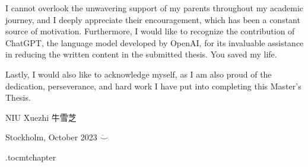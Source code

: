 I cannot overlook the unwavering support of my parents throughout my academic journey, and I deeply appreciate their encouragement, which has been a constant source of motivation. Furthermore, I would like to recognize the contribution of ChatGPT, the language model developed by OpenAI, for its invaluable assistance in reducing the written content in the submitted thesis. You saved my life.

Lastly, I would also like to acknowledge myself, as I am also proud of the dedication, perseverance, and hard work I have put into completing this Master's Thesis.

\vspace{2cm}
\hfill NIU Xuezhi 牛雪芝

\hfill Stockholm, October 2023 $\ddot\smile$

\newpage



\newpage

\etocdepthtag.toc{mtchapter}

\tableofcontents
\newpage